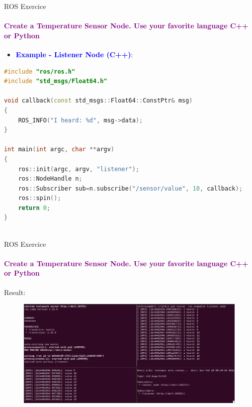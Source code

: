 \documentclass[aspectratio=169]{beamer}
\begin{document}
\begin{frame}[fragile]{ROS Exercice}
	\framesubtitle{\textcolor{purple}{Create a Temperature Sensor Node. Use your favorite language C++ or Python}}
	\begin{minipage}{0.6\textwidth}
	\begin{itemize}
		\item \textcolor{blue}{\textbf{Example - Listener Node (C++)}}:
	\end{itemize}
	\begin{lstlisting}[language=C++]
#include "ros/ros.h"
#include "std_msgs/Float64.h"

void callback(const std_msgs::Float64::ConstPtr& msg)
{
	ROS_INFO("I heard: %d", msg->data);
}

int main(int argc, char **argv)
{
	ros::init(argc, argv, "listener");
	ros::NodeHandle n;
	ros::Subscriber sub=n.subscribe("/sensor/value", 10, callback);
	ros::spin();
	return 0;
}
	
    \end{lstlisting}
\end{minipage}
\begin{minipage}{0.4\textwidth}
	
\end{minipage}
\end{frame}


\begin{frame}{ROS Exercice}
	\framesubtitle{\textcolor{purple}{Create a Temperature Sensor Node. Use your favorite language C++ or Python}}
	Result:
	\begin{figure}
		\includegraphics[width=1\textwidth]{./images/ros_sensor_example.png}
	\end{figure}
\end{frame}
\end{document}
